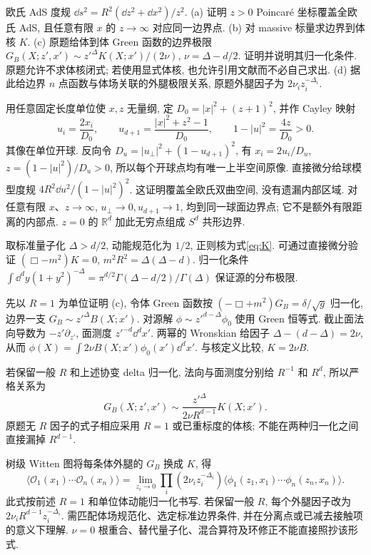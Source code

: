 \begin{exercise}
欧氏 AdS 度规 $\dd s^2=R^2(\dd z^2+\dd x^2)/z^2$.
(a) 证明 $z>0$ Poincaré 坐标覆盖全欧氏 AdS, 且任意有限 $x$ 的 $z\to\infty$ 对应同一边界点.
(b) 对 massive 标量求边界到体核 $K$.
(c) 原题给体到体 Green 函数的边界极限 $G_B(X;z',x')\sim z'^\Delta K(X;x')/(2\nu)$, $\nu=\Delta-d/2$. 证明并说明其归一化条件. 原题允许不求体核闭式; 若使用显式体核, 也允许引用文献而不必自己求出.
(d) 据此给边界 $n$ 点函数与体场关联的外腿极限关系, 原题外腿因子为 $2\nu_i z_i^{-\Delta_i}$.
\end{exercise}
\begin{solution}
用任意固定长度单位使 $x,z$ 无量纲, 定 $D_0=|x|^2+(z+1)^2$, 并作 Cayley 映射
\[
 u_i=\frac{2x_i}{D_0},\qquad
 u_{d+1}=\frac{|x|^2+z^2-1}{D_0},\qquad
 1-|u|^2=\frac{4z}{D_0}>0.
\]
其像在单位开球. 反向令 $D_u=|u_\perp|^2+(1-u_{d+1})^2$, 有 $x_i=2u_i/D_u$, $z=(1-|u|^2)/D_u>0$, 所以每个开球点均有唯一上半空间原像. 直接微分给球模型度规 $4R^2\dd u^2/(1-|u|^2)^2$. 这证明覆盖全欧氏双曲空间, 没有遗漏内部区域. 对任意有限 $x$、$z\to\infty$, $u_\perp\to0,u_{d+1}\to1$, 均到同一球面边界点; 它不是额外有限距离的内部点. $z=0$ 的 $\mathbb R^d$ 加此无穷点组成 $S^d$ 共形边界.

取标准量子化 $\Delta>d/2$, 动能规范化为 $1/2$, 正则核为式\eqref{eq:K}. 可通过直接微分验证 $(\Box-m^2)K=0$, $m^2R^2=\Delta(\Delta-d)$. 归一化条件 $\int\dd^dy(1+y^2)^{-\Delta}=\pi^{d/2}\Gamma(\Delta-d/2)/\Gamma(\Delta)$ 保证源的分布极限.

先以 $R=1$ 为单位证明 (c), 令体 Green 函数按 $(-\Box+m^2)G_B=\delta/\sqrt g$ 归一化, 边界一支 $G_B\sim z'^\Delta B(X;x')$. 对源解 $\phi\sim z'^{d-\Delta}\phi_0$ 使用 Green 恒等式. 截止面法向导数为 $-z'\partial_{z'}$, 面测度 $z'^{-d}\dd^dx'$. 两幂的 Wronskian 给因子 $\Delta-(d-\Delta)=2\nu$, 从而 $\phi(X)=\int2\nu B(X;x')\phi_0(x')\dd^dx'$. 与核定义比较, $K=2\nu B$.

若保留一般 $R$ 和上述协变 delta 归一化, 法向与面测度分别给 $R^{-1}$ 和 $R^d$, 所以严格关系为
\[
 G_B(X;z',x')\sim\frac{z'^\Delta}{2\nu R^{d-1}}K(X;x').
\]
原题无 $R$ 因子的式子相应采用 $R=1$ 或已重标度的体核; 不能在两种归一化之间直接漏掉 $R^{d-1}$.

树级 Witten 图将每条体外腿的 $G_B$ 换成 $K$, 得
\[
\langle\mathcal O_1(x_1)\cdots\mathcal O_n(x_n)\rangle
=\lim_{z_i\to0}\prod_i(2\nu_i z_i^{-\Delta_i})
\langle\phi_1(z_1,x_1)\cdots\phi_n(z_n,x_n)\rangle.
\]
此式按前述 $R=1$ 和单位体动能归一化书写. 若保留一般 $R$, 每个外腿因子改为 $2\nu_iR^{d-1}z_i^{-\Delta_i}$. 需匹配体场规范化、选定标准边界条件, 并在分离点或已减去接触项的意义下理解. $\nu=0$ 根重合、替代量子化、混合算符及环修正不能直接照抄该形式.
\end{solution}


